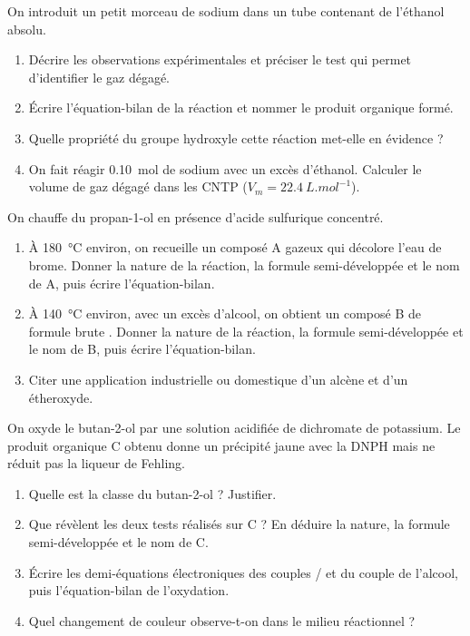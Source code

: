 \documentclass[11pt]{article}
\newcounter{popsec}
\newcounter{popsub}
\newcommand{\courssub}[1]{%
  \stepcounter{popsub}%
  \par\vspace{9pt}\noindent{\popxbold\fontsize{11.5}{13}\selectfont\color{popink}{\color{poporange}\thepopsec.\thepopsub}\hspace{6pt}#1}\par\nopagebreak\vspace{4pt}
}
\begin{document}
\courssub{Je m'entraîne}

\begin{exercice}
On introduit un petit morceau de sodium dans un tube contenant de l'éthanol absolu.
\begin{enumerate}
\item Décrire les observations expérimentales et préciser le test qui permet d'identifier le gaz dégagé.
\item Écrire l'équation-bilan de la réaction et nommer le produit organique formé.
\item Quelle propriété du groupe hydroxyle cette réaction met-elle en évidence ?
\item On fait réagir \SI{0,10}{mol} de sodium avec un excès d'éthanol. Calculer le volume de gaz dégagé dans les CNTP ($V_m = \SI{22,4}{L.mol^{-1}}$).
\end{enumerate}
\end{exercice}

\begin{exercice}
On chauffe du propan-1-ol en présence d'acide sulfurique concentré.
\begin{enumerate}
\item À \SI{180}{\celsius} environ, on recueille un composé A gazeux qui décolore l'eau de brome. Donner la nature de la réaction, la formule semi-développée et le nom de A, puis écrire l'équation-bilan.
\item À \SI{140}{\celsius} environ, avec un excès d'alcool, on obtient un composé B de formule brute . Donner la nature de la réaction, la formule semi-développée et le nom de B, puis écrire l'équation-bilan.
\item Citer une application industrielle ou domestique d'un alcène et d'un étheroxyde.
\end{enumerate}
\end{exercice}

\begin{exercice}
On oxyde le butan-2-ol par une solution acidifiée de dichromate de potassium. Le produit organique C obtenu donne un précipité jaune avec la DNPH mais ne réduit pas la liqueur de Fehling.
\begin{enumerate}
\item Quelle est la classe du butan-2-ol ? Justifier.
\item Que révèlent les deux tests réalisés sur C ? En déduire la nature, la formule semi-développée et le nom de C.
\item Écrire les demi-équations électroniques des couples / et du couple de l'alcool, puis l'équation-bilan de l'oxydation.
\item Quel changement de couleur observe-t-on dans le milieu réactionnel ?
\end{enumerate}
\end{exercice}
\end{document}
